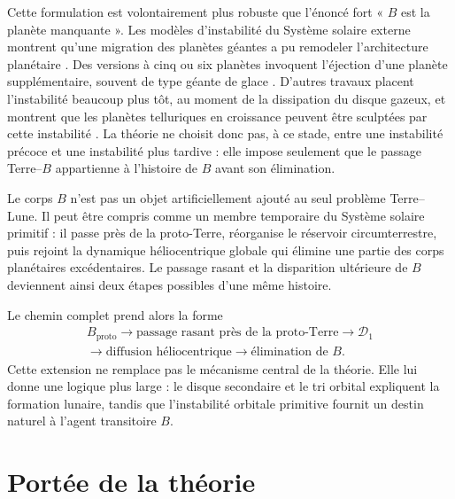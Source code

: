 \documentclass[11pt,a4paper,openany]{report}
\begin{document}
Cette formulation est volontairement plus robuste que l'énoncé fort « $B$ est la planète
manquante ». Les modèles d'instabilité du Système solaire externe montrent qu'une migration des
planètes géantes a pu remodeler l'architecture planétaire \cite{Tsiganis2005,Gomes2005}. Des
versions à cinq ou six planètes invoquent l'éjection d'une planète supplémentaire, souvent de type
géante de glace \cite{Nesvorny2011,NesvornyMorbidelli2012}. D'autres travaux placent l'instabilité
beaucoup plus tôt, au moment de la dissipation du disque gazeux, et montrent que les planètes
telluriques en croissance peuvent être sculptées par cette instabilité \cite{Liu2022,Clement2018}.
La théorie ne choisit donc pas, à ce stade, entre une instabilité précoce et une instabilité plus
tardive : elle impose seulement que le passage Terre--$B$ appartienne à l'histoire de $B$ avant son
élimination.

\begin{ideephys}
Le corps $B$ n'est pas un objet artificiellement ajouté au seul problème Terre--Lune. Il peut
être compris comme un membre temporaire du Système solaire primitif : il passe près de la
proto-Terre, réorganise le réservoir circumterrestre, puis rejoint la dynamique héliocentrique
globale qui élimine une partie des corps planétaires excédentaires. Le passage rasant et la
disparition ultérieure de $B$ deviennent ainsi deux étapes possibles d'une même histoire.
\end{ideephys}

Le chemin complet prend alors la forme
\begin{equation}
\boxed{\begin{gathered}
B_{\mathrm{proto}}\longrightarrow\text{passage rasant près de la proto-Terre}
\longrightarrow\mathcal{D}_1\\
\longrightarrow\text{diffusion héliocentrique}
\longrightarrow\text{élimination de }B.
\end{gathered}}
\label{eq:cheminB}
\end{equation}
Cette extension ne remplace pas le mécanisme central de la théorie. Elle lui donne une logique
plus large : le disque secondaire et le tri orbital expliquent la formation lunaire, tandis que
l'instabilité orbitale primitive fournit un destin naturel à l'agent transitoire $B$.

\section{Portée de la théorie}
\end{document}
